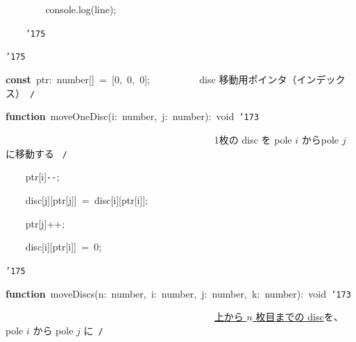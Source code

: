 \documentclass[a4paper,10pt]{article}
\def\mc{\relax}
\begin{document}
\noindent
\mbox{}{\tt\mc \ }{\tt\mc \ }{\tt\mc \ }{\tt\mc \ }{\tt\mc \ }{\tt\mc \ }{\tt\mc \ }{\tt\mc \ }console.log(line);

\noindent
\mbox{}{\tt\mc \ }{\tt\mc \ }{\tt\mc \ }{\tt\mc \ }{\tt\char'175}

\noindent
\mbox{}{\tt\char'175}

\noindent
\mbox{}\hfill

\noindent
\mbox{}\textbf{const}{\tt\mc \ }ptr:{\tt\mc \ }number[]{\tt\mc \ }={\tt\mc \ }[0,{\tt\mc \ }0,{\tt\mc \ }0];{\tt\mc \ }{\tt\mc \ }{\tt\mc \ }{\tt\mc \ }{\tt\mc \ }{\tt\mc \ }{\tt\mc \ }{\tt\mc \ }\rm\mc {\tt /}{\tt *}\  \ disc 移動用ポインタ（インデックス）\hfill \rm\mc \ {\tt *}{\tt /}
\tt\mc 

\noindent
\mbox{}\hfill

\noindent
\mbox{}\textbf{function}{\tt\mc \ }moveOneDisc(i:{\tt\mc \ }number,{\tt\mc \ }j:{\tt\mc \ }number):{\tt\mc \ }void{\tt\mc \ }{\tt\char'173}

\noindent
\mbox{}{\tt\mc \ }{\tt\mc \ }{\tt\mc \ }{\tt\mc \ }{\tt\mc \ }{\tt\mc \ }{\tt\mc \ }{\tt\mc \ }{\tt\mc \ }{\tt\mc \ }{\tt\mc \ }{\tt\mc \ }{\tt\mc \ }{\tt\mc \ }{\tt\mc \ }{\tt\mc \ }{\tt\mc \ }{\tt\mc \ }{\tt\mc \ }{\tt\mc \ }{\tt\mc \ }{\tt\mc \ }{\tt\mc \ }{\tt\mc \ }{\tt\mc \ }{\tt\mc \ }{\tt\mc \ }{\tt\mc \ }{\tt\mc \ }{\tt\mc \ }{\tt\mc \ }{\tt\mc \ }{\tt\mc \ }{\tt\mc \ }{\tt\mc \ }{\tt\mc \ }{\tt\mc \ }{\tt\mc \ }{\tt\mc \ }{\tt\mc \ }\rm\mc {\tt /}{\tt *}\  \ 1枚の disc を pole $i$ からpole $j$ に移動する \hfill \rm\mc \ {\tt *}{\tt /}
\tt\mc 

\noindent
\mbox{}{\tt\mc \ }{\tt\mc \ }{\tt\mc \ }{\tt\mc \ }ptr[i]{\tt -}{\tt -};

\noindent
\mbox{}{\tt\mc \ }{\tt\mc \ }{\tt\mc \ }{\tt\mc \ }disc[j][ptr[j]]{\tt\mc \ }={\tt\mc \ }disc[i][ptr[i]];

\noindent
\mbox{}{\tt\mc \ }{\tt\mc \ }{\tt\mc \ }{\tt\mc \ }ptr[j]++;

\noindent
\mbox{}{\tt\mc \ }{\tt\mc \ }{\tt\mc \ }{\tt\mc \ }disc[i][ptr[i]]{\tt\mc \ }={\tt\mc \ }0;

\noindent
\mbox{}{\tt\char'175}

\noindent
\mbox{}\hfill

\noindent
\mbox{}\textbf{function}{\tt\mc \ }moveDiscs(n:{\tt\mc \ }number,{\tt\mc \ }i:{\tt\mc \ }number,{\tt\mc \ }j:{\tt\mc \ }number,{\tt\mc \ }k:{\tt\mc \ }number):{\tt\mc \ }void{\tt\mc \ }{\tt\char'173}

\noindent
\mbox{}{\tt\mc \ }{\tt\mc \ }{\tt\mc \ }{\tt\mc \ }{\tt\mc \ }{\tt\mc \ }{\tt\mc \ }{\tt\mc \ }{\tt\mc \ }{\tt\mc \ }{\tt\mc \ }{\tt\mc \ }{\tt\mc \ }{\tt\mc \ }{\tt\mc \ }{\tt\mc \ }{\tt\mc \ }{\tt\mc \ }{\tt\mc \ }{\tt\mc \ }{\tt\mc \ }{\tt\mc \ }{\tt\mc \ }{\tt\mc \ }{\tt\mc \ }{\tt\mc \ }{\tt\mc \ }{\tt\mc \ }{\tt\mc \ }{\tt\mc \ }{\tt\mc \ }{\tt\mc \ }{\tt\mc \ }{\tt\mc \ }{\tt\mc \ }{\tt\mc \ }{\tt\mc \ }{\tt\mc \ }{\tt\mc \ }{\tt\mc \ }\rm\mc {\tt /}{\tt *}\  \ \underline{\textsf{上から $n$ 枚目までの disc}}を、pole $i$ から pole $j$ に\hfill \rm\mc \ {\tt *}{\tt /}
\tt\mc 
\end{document}

